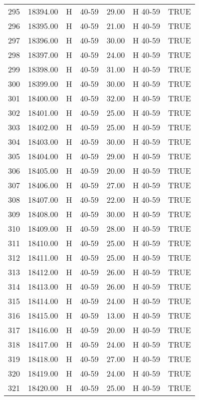 \begin{table}[ht]
\begin{tabular}{rrllrll}
  295 & 18394.00 & H & 40-59 & 29.00 & H 40-59 & TRUE \\ 
  296 & 18395.00 & H & 40-59 & 21.00 & H 40-59 & TRUE \\ 
  297 & 18396.00 & H & 40-59 & 30.00 & H 40-59 & TRUE \\ 
  298 & 18397.00 & H & 40-59 & 24.00 & H 40-59 & TRUE \\ 
  299 & 18398.00 & H & 40-59 & 31.00 & H 40-59 & TRUE \\ 
  300 & 18399.00 & H & 40-59 & 30.00 & H 40-59 & TRUE \\ 
  301 & 18400.00 & H & 40-59 & 32.00 & H 40-59 & TRUE \\ 
  302 & 18401.00 & H & 40-59 & 25.00 & H 40-59 & TRUE \\ 
  303 & 18402.00 & H & 40-59 & 25.00 & H 40-59 & TRUE \\ 
  304 & 18403.00 & H & 40-59 & 30.00 & H 40-59 & TRUE \\ 
  305 & 18404.00 & H & 40-59 & 29.00 & H 40-59 & TRUE \\ 
  306 & 18405.00 & H & 40-59 & 20.00 & H 40-59 & TRUE \\ 
  307 & 18406.00 & H & 40-59 & 27.00 & H 40-59 & TRUE \\ 
  308 & 18407.00 & H & 40-59 & 22.00 & H 40-59 & TRUE \\ 
  309 & 18408.00 & H & 40-59 & 30.00 & H 40-59 & TRUE \\ 
  310 & 18409.00 & H & 40-59 & 28.00 & H 40-59 & TRUE \\ 
  311 & 18410.00 & H & 40-59 & 25.00 & H 40-59 & TRUE \\ 
  312 & 18411.00 & H & 40-59 & 25.00 & H 40-59 & TRUE \\ 
  313 & 18412.00 & H & 40-59 & 26.00 & H 40-59 & TRUE \\ 
  314 & 18413.00 & H & 40-59 & 26.00 & H 40-59 & TRUE \\ 
  315 & 18414.00 & H & 40-59 & 24.00 & H 40-59 & TRUE \\ 
  316 & 18415.00 & H & 40-59 & 13.00 & H 40-59 & TRUE \\ 
  317 & 18416.00 & H & 40-59 & 20.00 & H 40-59 & TRUE \\ 
  318 & 18417.00 & H & 40-59 & 24.00 & H 40-59 & TRUE \\ 
  319 & 18418.00 & H & 40-59 & 27.00 & H 40-59 & TRUE \\ 
  320 & 18419.00 & H & 40-59 & 24.00 & H 40-59 & TRUE \\ 
  321 & 18420.00 & H & 40-59 & 25.00 & H 40-59 & TRUE \\ 

\end{tabular}
\end{table}
